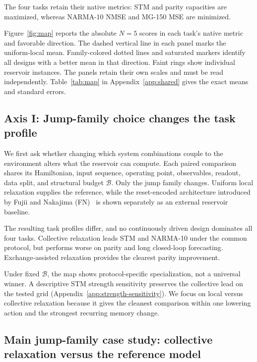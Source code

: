 The four tasks retain their native metrics: STM and parity capacities are
maximized, whereas NARMA-10 NMSE and MG-150 MSE are minimized.

Figure~\ref{fig:map} reports the absolute \(N=5\) scores in each task's native
metric and favorable direction. The dashed vertical line in each panel marks
the uniform-local mean. Family-colored dotted lines and saturated markers
identify all designs with a better mean in that direction. Faint rings show
individual reservoir instances. The
panels retain their own scales and must be read independently.
Table~\ref{tab:map} in Appendix~\ref{app:shared} gives the exact means and
standard errors.

\subsection{Axis I: Jump-family choice changes the task profile}
\label{sec:map}

We first ask whether changing which system combinations couple to the
environment alters what the reservoir can compute.
Each paired comparison
shares its Hamiltonian, input sequence, operating point, observables, readout,
data split, and structural budget \(\mathcal B\). Only the jump family
changes. Uniform local relaxation supplies the reference, while the
reset-encoded architecture introduced by Fujii and Nakajima (FN)~\cite{Fujii2017} is shown
separately as an external reservoir baseline.

The resulting task profiles differ, and no continuously driven design
dominates all four tasks. Collective relaxation leads STM and NARMA-10 under
the common protocol, but performs worse on parity and long closed-loop
forecasting. Exchange-assisted relaxation provides the clearest parity
improvement.

Under fixed \(\mathcal B\), the map shows protocol-specific specialization, not
a universal winner. A descriptive STM strength sensitivity preserves the
collective lead on the tested grid (Appendix~\ref{app:strength-sensitivity}).
We focus on local versus collective relaxation because it gives the cleanest
comparison within one lowering action and the strongest recurring memory change.

\subsection{Main jump-family case study: collective relaxation versus the
reference model}
\label{sec:collective-case}

